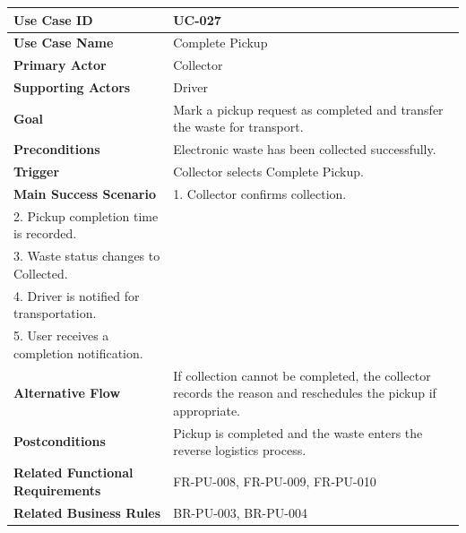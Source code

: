 \begin{longtable}{|p{4cm}|p{10cm}|}

\hline
\textbf{Use Case ID} &
UC-027 \\
\hline

\textbf{Use Case Name} &
Complete Pickup \\
\hline

\textbf{Primary Actor} &
Collector \\
\hline

\textbf{Supporting Actors} &
Driver \\
\hline

\textbf{Goal} &
Mark a pickup request as completed and transfer the waste for transport. \\
\hline

\textbf{Preconditions} &
Electronic waste has been collected successfully. \\
\hline

\textbf{Trigger} &
Collector selects Complete Pickup. \\
\hline

\textbf{Main Success Scenario} &
1. Collector confirms collection.\\
2. Pickup completion time is recorded.\\
3. Waste status changes to Collected.\\
4. Driver is notified for transportation.\\
5. User receives a completion notification.\\
\hline

\textbf{Alternative Flow} &
If collection cannot be completed, the collector records the reason and
reschedules the pickup if appropriate.\\
\hline

\textbf{Postconditions} &
Pickup is completed and the waste enters the reverse logistics process.\\
\hline

\textbf{Related Functional Requirements} &
FR-PU-008, FR-PU-009, FR-PU-010 \\
\hline

\textbf{Related Business Rules} &
BR-PU-003, BR-PU-004 \\
\hline

\end{longtable}

